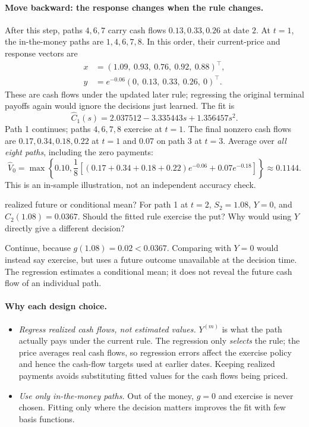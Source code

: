 \documentclass[10pt]{article}
\newcommand{\1}{\mathbf 1}
\theoremstyle{definition}
\begin{document}
\paragraph{Move backward: the response changes when the rule changes.}
After this step, paths \(4,6,7\) carry cash flows \(0.13,0.33,0.26\)
at date \(2\). At \(t=1\), the in-the-money paths are \(1,4,6,7,8\).
In this order, their current-price and response vectors are
\[
\begin{aligned}
x&=(1.09,\ 0.93,\ 0.76,\ 0.92,\ 0.88)^\top,\\
y&=e^{-0.06}(0,\ 0.13,\ 0.33,\ 0.26,\ 0)^\top.
\end{aligned}
\]
These are cash flows under the updated later rule; regressing the original
terminal payoffs again would ignore the decisions just learned. The fit is
\[
\widehat C_1(s)=2.037512-3.335443s+1.356457s^2.
\]
Path 1 continues; paths \(4,6,7,8\) exercise at \(t=1\). The final
nonzero cash flows are \(0.17,0.34,0.18,0.22\) at \(t=1\) and
\(0.07\) on path 3 at \(t=3\). Average over \emph{all eight paths},
including the zero payments:
\[
\widehat V_0=\max\left\{0.10,\frac18\left[
(0.17+0.34+0.18+0.22)e^{-0.06}+0.07e^{-0.18}\right]\right\}
\approx0.1144.
\]
This is an in-sample illustration, not an independent accuracy check.

\begin{studentexercise}{realized future or conditional mean?}
For path 1 at \(t=2\), \(S_2=1.08\), \(Y=0\), and
\(\widehat C_2(1.08)=0.0367\). Should the fitted rule exercise the put?
Why would using \(Y\) directly give a different decision?
\end{studentexercise}
\begin{shortsolution}
Continue, because \(g(1.08)=0.02<0.0367\). Comparing with \(Y=0\)
would instead say exercise, but uses a future outcome unavailable at the
decision time. The regression estimates a conditional mean; it does not
reveal the future cash flow of an individual path.
\end{shortsolution}

\paragraph{Why each design choice.}
\begin{itemize}
\item \emph{Regress realized cash flows, not estimated values.} \(Y^{(m)}\) is
      what the path actually pays under the current rule. The regression only
      \emph{selects} the rule; the price averages real cash flows, so
      regression errors affect the exercise policy and hence the cash-flow
      targets used at earlier dates. Keeping realized payments avoids
      substituting fitted values for the cash flows being priced.
\item \emph{Use only in-the-money paths.} Out of the money, \(g=0\) and
      exercise is never chosen. Fitting only where the decision matters
      improves the fit with few basis functions.
\end{itemize}
\end{document}
